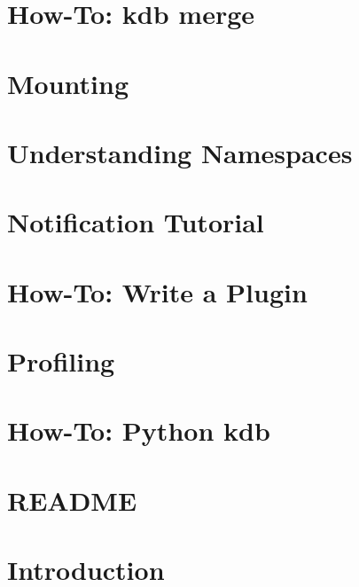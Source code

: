 \documentclass[twoside]{book}
\newcommand{\+}{\discretionary{\mbox{\scriptsize$\hookleftarrow$}}{}{}}
\begin{document}
\chapter{How-\/\+To\+: kdb merge}
\label{doc_tutorials_merge_md}

\chapter{Mounting}
\label{doc_tutorials_mount_md}

\chapter{Understanding Namespaces}
\label{doc_tutorials_namespaces_md}

\chapter{Notification Tutorial}
\label{doc_tutorials_notifications_md}

\chapter{How-\/\+To\+: Write a Plugin}
\label{doc_tutorials_plugins_md}

\chapter{Profiling}
\label{doc_tutorials_profiling_md}

\chapter{How-\/\+To\+: Python kdb}
\label{doc_tutorials_python-kdb_md}

\chapter{R\+E\+A\+D\+ME}
\label{md_doc_tutorials_README}

\chapter{Introduction}
\label{doc_tutorials_run_all_tests_with_docker_md}

\end{document}
